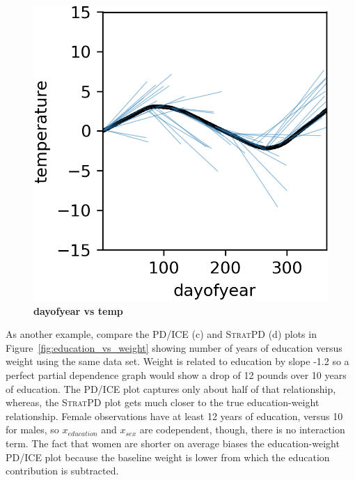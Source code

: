 \documentclass[12pt]{article}
\newcommand{\figref}[1]{Figure~\ref{#1}}
\newcommand{\spd}{\fontfamily{cmr}\textsc{\small StratPD}}
\begin{document}
\begin{figure}[htbp]
\begin{center}
\includegraphics[scale=0.7]{images/dayofyear_vs_temp_stratpd.png}
\caption{{\bf  dayofyear  vs temp}}
\label{fig:dayofyear_vs_temp}
\end{center}
\end{figure}

As another example, compare the PD/ICE (c) and \spd{} (d) plots in \figref{fig:education_vs_weight} showing number of years of education versus weight using the same data set. Weight is related to education by slope -1.2 so a perfect partial dependence graph would show a drop of 12 pounds over 10 years of education.   The PD/ICE plot captures only about half of that relationship, whereas, the \spd{} plot gets much closer to the true education-weight relationship. Female observations have at least 12 years of education, versus 10 for males, so $x_{education}$ and $x_{sex}$ are codependent, though, there is no interaction term. The fact that women are shorter on average biases the education-weight PD/ICE plot because the baseline weight is lower from which the education contribution is  subtracted.
\end{document}
